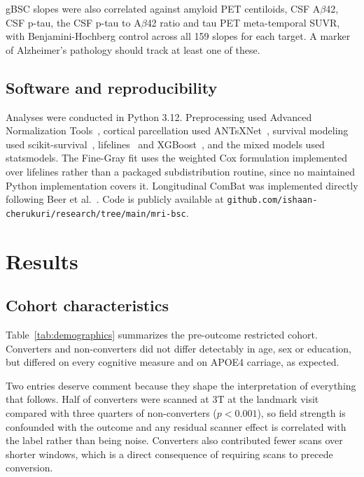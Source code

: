 \documentclass[blue]{ludusofficial}  %
\begin{document}
gBSC slopes were also correlated against amyloid PET centiloids, CSF A$\beta$42, CSF p-tau, the CSF p-tau to A$\beta$42 ratio and tau PET meta-temporal SUVR, with Benjamini-Hochberg control across all 159 slopes for each target. A marker of Alzheimer's pathology should track at least one of these.

\subsection{Software and reproducibility}

Analyses were conducted in Python 3.12. Preprocessing used Advanced Normalization Tools~\cite{avants2011ants}, cortical parcellation used ANTsXNet~\cite{tustison2021antsxnet}, survival modeling used scikit-survival~\cite{polsterl2020sksurv}, lifelines~\cite{davidson-pilon2019lifelines} and XGBoost~\cite{chen2016xgboost}, and the mixed models used statsmodels. The Fine-Gray fit uses the weighted Cox formulation implemented over lifelines rather than a packaged subdistribution routine, since no maintained Python implementation covers it. Longitudinal ComBat was implemented directly following Beer et al.~\cite{beer2020longitudinal}. Code is publicly available at \texttt{github.com/ishaan-cherukuri/research/tree/main/mri-bsc}.

\section{Results}

\subsection{Cohort characteristics}


Table~\ref{tab:demographics} summarizes the pre-outcome restricted cohort. Converters and non-converters did not differ detectably in age, sex or education, but differed on every cognitive measure and on APOE4 carriage, as expected.

Two entries deserve comment because they shape the interpretation of everything that follows. Half of converters were scanned at 3T at the landmark visit compared with three quarters of non-converters ($p<0.001$), so field strength is confounded with the outcome and any residual scanner effect is correlated with the label rather than being noise. Converters also contributed fewer scans over shorter windows, which is a direct consequence of requiring scans to precede conversion.
\end{document}
